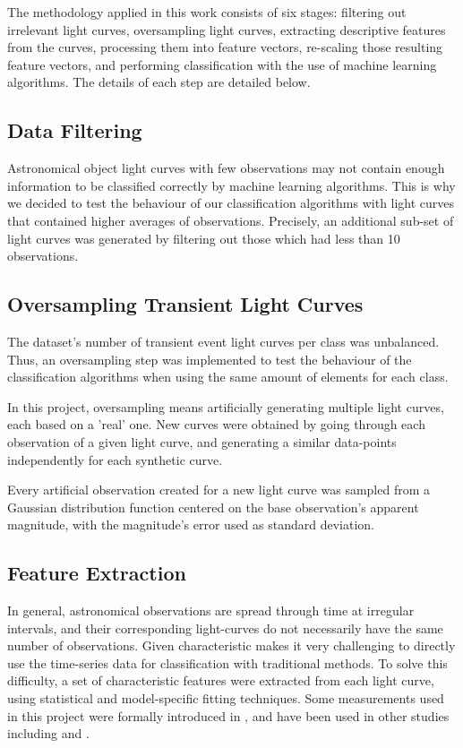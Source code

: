 The methodology applied in this work consists of six stages: filtering out irrelevant light curves, oversampling light curves, extracting descriptive features from the curves, processing them into feature vectors, re-scaling those resulting feature vectors, and performing classification with the use of machine learning algorithms. The details of each step are detailed below.

\subsection{Data Filtering} \label{subsection_filtering}

Astronomical object light curves with few observations may not contain enough information to be classified correctly by machine learning algorithms. 
This is why we decided to test the behaviour of our classification algorithms with light curves that contained higher averages of observations. Precisely, an additional sub-set of light curves was generated by filtering out those which had less than 10 observations.


\subsection{Oversampling Transient Light Curves} \label{subsection_oversampling}

The dataset's number of transient event light curves per class was unbalanced. Thus, an oversampling step was implemented to test the behaviour of the classification algorithms when using the same amount of elements for each class.

In this project, oversampling means artificially generating multiple light curves, each based on a 'real' one. New curves were obtained by going through each observation of a given light curve, and generating a similar data-points independently for each synthetic curve.

Every artificial observation created for a new light curve was sampled from a Gaussian distribution function centered on the base observation's apparent magnitude, with the magnitude's error used as standard deviation.

\subsection{Feature Extraction} \label{subsection_extraction}

In general, astronomical observations are spread through time at irregular intervals, and their corresponding light-curves do not necessarily have the same number of observations. Given characteristic makes it very challenging to directly use the time-series data for classification with traditional methods. To solve this difficulty, a set of characteristic features were extracted from each light curve, using statistical and model-specific fitting techniques. Some measurements used in this project were formally introduced in \cite{1101.1959}, and have been used in other studies including \cite{1603.00882} and \cite{1601.03931}.

